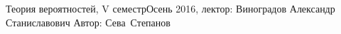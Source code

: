 


\BigHeader
    {Теория вероятностей, V семестр}{Осень 2016, лектор: Виноградов Александр Станиславович}
    {Автор: Сева~Степанов}
\gdef\LectureName{Теор. вер-тей, V семестр}

%

